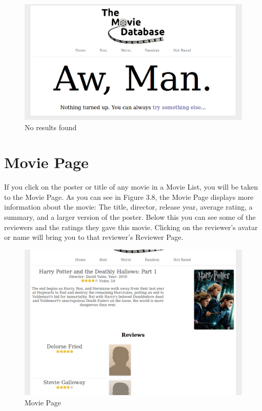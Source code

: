 \documentclass[10pt,a4paper]{scrreprt}
\begin{document}
\begin{figure}[H]
\centering
\includegraphics[scale=.25]{nosearch.png}
\caption{No results found}
\end{figure}

\section{Movie Page}
If you click on the poster or title of any movie in a Movie List, you will be taken to the Movie Page. As you can see in Figure 3.8, the Movie Page displays more information about the movie: The title, director, release year, average rating, a summary, and a larger version of the poster. Below this you can see some of the reviewers and the ratings they gave this movie. Clicking on the reviewer's avatar or name will bring you to that reviewer's Reviewer Page.

\begin{figure}[H]
\centering
\includegraphics[scale=.25]{movie.png}
\caption{Movie Page}
\end{figure}
\end{document}
